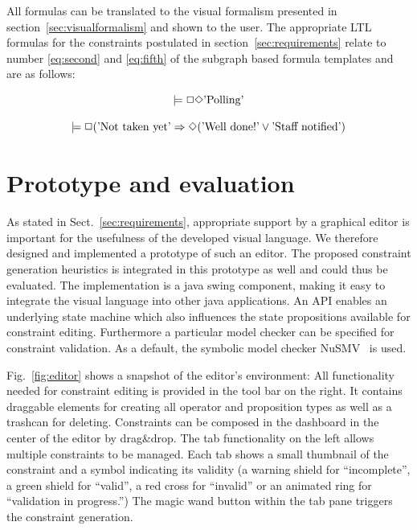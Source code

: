 \documentclass[conference]{IEEEtran}
\begin{document}
All formulas can be translated to the visual formalism presented in section~\ref{sec:visualformalism} and shown to the user. The appropriate LTL formulas for the constraints postulated in section~\ref{sec:requirements} relate to number \ref{eq:second} and \ref{eq:fifth} of the subgraph based formula templates and are as follows:

\begin{equation}
  \models \Box \Diamond \textnormal{'Polling'}
\end{equation}

\begin{equation}
	\models \Box (\textnormal{'Not taken yet'} \Rightarrow \Diamond (\textnormal{'Well done!'} \vee \textnormal{'Staff notified'})
\end{equation}


\section{Prototype and evaluation}

As stated in Sect.~\ref{sec:requirements}, appropriate support by a graphical editor is important for the usefulness of the developed visual language. We therefore designed and implemented a prototype of such an editor. The proposed constraint generation heuristics is integrated in this prototype as well and could thus be evaluated. The implementation is a java swing component, making it easy to integrate the visual language into other java applications. An API enables an underlying state machine which also influences the state propositions available for constraint editing. Furthermore a particular model checker can be specified for constraint validation. As a default, the symbolic model checker NuSMV~\cite{springerlink:10.1007/s100090050046,NuSMV2} is used.

Fig.~\ref{fig:editor} shows a snapshot of the editor's environment: All functionality needed for constraint editing is provided in the tool bar on the right. It contains draggable elements for creating all operator and proposition types as well as a trashcan for deleting. Constraints can be composed in the dashboard in the center of the editor by drag\&drop. The tab functionality on the left allows multiple constraints to be managed. Each tab shows a small thumbnail of the constraint and a symbol indicating its validity (a warning shield for ``incomplete'', a green shield for ``valid'', a red cross for ``invalid'' or an animated ring for ``validation in progress.'') The magic wand button within the tab pane triggers the constraint generation.
\end{document}

